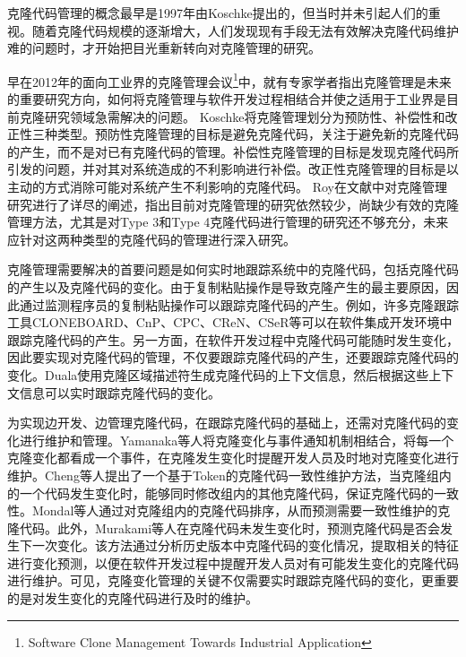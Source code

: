 克隆代码管理的概念最早是1997年由Koschke提出的\cite{koschke2008frontiers}，但当时并未引起人们的重视。随着克隆代码规模的逐渐增大，人们发现现有手段无法有效解决克隆代码维护难的问题时，才开始把目光重新转向对克隆管理的研究。

早在2012年的面向工业界的克隆管理会议\footnote{Software Clone Management Towards Industrial Application}中，就有专家学者指出克隆管理是未来的重要研究方向，如何将克隆管理与软件开发过程相结合并使之适用于工业界是目前克隆研究领域急需解决的问题\cite{koschke2012software}。%
Koschke将克隆管理划分为预防性、补偿性和改正性三种类型\cite{koschke2008frontiers}。预防性克隆管理的目标是避免克隆代码，关注于避免新的克隆代码的产生，而不是对已有克隆代码的管理。补偿性克隆管理的目标是发现克隆代码所引发的问题，并对其对系统造成的不利影响进行补偿。改正性克隆管理的目标是以主动的方式消除可能对系统产生不利影响的克隆代码。%
Roy在文献\cite{roy2014vision}中对克隆管理研究进行了详尽的阐述，指出目前对克隆管理的研究依然较少，尚缺少有效的克隆管理方法，尤其是对Type 3和Type 4克隆代码进行管理的研究还不够充分，未来应针对这两种类型的克隆代码的管理进行深入研究。%

克隆管理需要解决的首要问题是如何实时地跟踪系统中的克隆代码，包括克隆代码的产生以及克隆代码的变化。由于复制粘贴操作是导致克隆产生的最主要原因，因此通过监测程序员的复制粘贴操作可以跟踪克隆代码的产生。例如，许多克隆跟踪工具CLONEBOARD\cite{de2009managing}、CnP\cite{hou2009cnp}、CPC\cite{weckerle2008cpc}、CReN\cite{jablonski2007cren}、CSeR\cite{jacob2010actively}等可以在软件集成开发环境中跟踪克隆代码的产生。另一方面，在软件开发过程中克隆代码可能随时发生变化，因此要实现对克隆代码的管理，不仅要跟踪克隆代码的产生，还要跟踪克隆代码的变化。Duala使用克隆区域描述符生成克隆代码的上下文信息，然后根据这些上下文信息可以实时跟踪克隆代码的变化\cite{duala2008clonetracker}。%

为实现边开发、边管理克隆代码，在跟踪克隆代码的基础上，还需对克隆代码的变化进行维护和管理。Yamanaka等人\cite{yamanaka2013applying}将克隆变化与事件通知机制相结合，将每一个克隆变化都看成一个事件，在克隆发生变化时提醒开发人员及时地对克隆变化进行维护。Cheng等人\cite{cheng2016rule}提出了一个基于Token的克隆代码一致性维护方法，当克隆组内的一个代码发生变化时，能够同时修改组内的其他克隆代码，保证克隆代码的一致性。Mondal等人通过对克隆组内的克隆代码排序，从而预测需要一致性维护的克隆代码\cite{mondal2014prediction}。此外，Murakami等人在克隆代码未发生变化时，预测克隆代码是否会发生下一次变化\cite{murakami2014predicting}。该方法通过分析历史版本中克隆代码的变化情况，提取相关的特征进行变化预测，以便在软件开发过程中提醒开发人员对有可能发生变化的克隆代码进行维护。可见，克隆变化管理的关键不仅需要实时跟踪克隆代码的变化，更重要的是对发生变化的克隆代码进行及时的维护。

